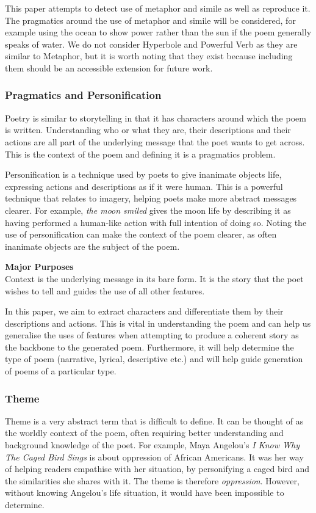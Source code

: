 This paper attempts to detect use of metaphor and simile as well as reproduce it. The pragmatics around the use of metaphor and simile will be considered, for example using the ocean to show power rather than the sun if the poem generally speaks of water. We do not consider Hyperbole and Powerful Verb as they are similar to Metaphor, but it is worth noting that they exist because including them should be an accessible extension for future work.

\subsubsection{Pragmatics and Personification}
\label{sec:pragpers}
Poetry is similar to storytelling in that it has characters around which the poem is written. Understanding who or what they are, their descriptions and their actions are all part of the underlying message that the poet wants to get across. This is the context of the poem and defining it is a pragmatics problem.

Personification is a technique used by poets to give inanimate objects life, expressing actions and descriptions as if it were human. This is a powerful technique that relates to imagery, helping poets make more abstract messages clearer. For example, \textit{the moon smiled} gives the moon life by describing it as having performed a human-like action with full intention of doing so. Noting the use of personification can make the context of the poem clearer, as often inanimate objects are the subject of the poem.

\textbf{Major Purposes}\\
Context is the underlying message in its bare form. It is the story that the poet wishes to tell and guides the use of all other features.

In this paper, we aim to extract characters and differentiate them by their descriptions and actions. This is vital in understanding the poem and can help us generalise the uses of features when attempting to produce a coherent story as the backbone to the generated poem. Furthermore, it will help determine the type of poem (narrative, lyrical, descriptive etc.) and will help guide generation of poems of a particular type. 

\subsubsection{Theme}
Theme is a very abstract term that is difficult to define. It can be thought of as the worldly context of the poem, often requiring better understanding and background knowledge of the poet. For example, Maya Angelou's \textit{I Know Why The Caged Bird Sings} is about oppression of African Americans. It was her way of helping readers empathise with her situation, by personifying a caged bird and the similarities she shares with it. The theme is therefore \textit{oppression}. However, without knowing Angelou's life situation, it would have been impossible to determine.

